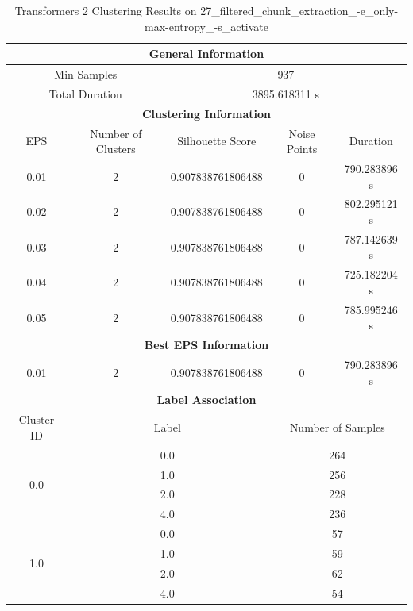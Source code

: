 \begin{longtable}{|c|c|c|c|c|}
\caption{Transformers 2 Clustering Results on 27\_filtered\_chunk\_extraction\_-e\_only-max-entropy\_-s\_activate} \label{tab:27_filtered_chunk_extraction_-e_only-max-entropy_-s_activate_transformers_2_clustering_results}\\
\hline
\multicolumn{5}{|c|}{\textbf{General Information}} \\
\hline
\multicolumn{2}{|c|}{Min Samples} & \multicolumn{3}{c|}{937} \\
\multicolumn{2}{|c|}{Total Duration} & \multicolumn{3}{c|}{3895.618311 s} \\
\hline
\multicolumn{5}{|c|}{\textbf{Clustering Information}} \\
\hline
EPS & Number of Clusters & Silhouette Score & Noise Points & Duration \\
0.01 & 2 & 0.907838761806488 & 0 & 790.283896 s\\
0.02 & 2 & 0.907838761806488 & 0 & 802.295121 s\\
0.03 & 2 & 0.907838761806488 & 0 & 787.142639 s\\
0.04 & 2 & 0.907838761806488 & 0 & 725.182204 s\\
0.05 & 2 & 0.907838761806488 & 0 & 785.995246 s\\
\hline
\multicolumn{5}{|c|}{\textbf{Best EPS Information}} \\
\hline
0.01 & 2 & 0.907838761806488 & 0 & 790.283896 s\\
\hline
\multicolumn{5}{|c|}{\textbf{Label Association}} \\
\hline
Cluster ID & \multicolumn{2}{c|}{Label} & \multicolumn{2}{c|}{Number of Samples} \\
\hline
\multirow{4}{*}{0.0} & \multicolumn{2}{c|}{0.0} & \multicolumn{2}{c|}{264} \\
& \multicolumn{2}{c|}{1.0} & \multicolumn{2}{c|}{256} \\
& \multicolumn{2}{c|}{2.0} & \multicolumn{2}{c|}{228} \\
& \multicolumn{2}{c|}{4.0} & \multicolumn{2}{c|}{236} \\
\hline
\multirow{4}{*}{1.0} & \multicolumn{2}{c|}{0.0} & \multicolumn{2}{c|}{57} \\
& \multicolumn{2}{c|}{1.0} & \multicolumn{2}{c|}{59} \\
& \multicolumn{2}{c|}{2.0} & \multicolumn{2}{c|}{62} \\
& \multicolumn{2}{c|}{4.0} & \multicolumn{2}{c|}{54} \\
\hline
\end{longtable}



